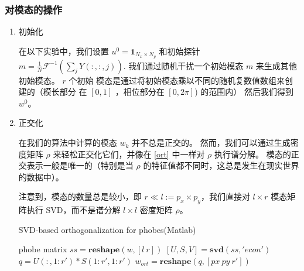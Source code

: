 \documentclass[12pt]{article}
\begin{document}
\subsubsection{对模态的操作}
\begin{enumerate} 
	\item 初始化
	
	在以下实验中，我们设置 $u^{0}=\mathbf{1}_{N_x \times N_y}$ 和初始探针
	$m=\frac{1}{N} \mathcal{F}^{-1}\left(\sum_{j} Y(:,:,j)\right)$. 我们通过随机干扰一个初始模态 $m$ 来生成其他初始模态。 $r$ 个初始
	模态是通过将初始模态乘以不同的随机复数值数组来创建的（模长部分
	在 $[0,1]$ ，相位部分在 $[0,2\pi]$) 的范围内） 然后我们得到$w^0$。
	
	\item 正交化
	
	在我们的算法中计算的模态 $w_k$ 并不总是正交的。 然而，我们可以通过生成密度矩阵 $\rho$ 来轻松正交化它们，并像在 \eqref{ort} 中一样对 $\rho$ 执行谱分解。 模态的正交表示一般是唯一的（特别是当 $\rho$ 的特征值都不同时，这总是发生在现实世界的数据中）。
	
	注意到，模态的数量总是较小，即 $r \ll l := p_x \times p_y$，我们直接对 $l \times r$ 模态矩阵执行 SVD，而不是谱分解 $l \times l$ 密度矩阵 $\rho $。
	
	\begin{algorithm}
		\caption{SVD-based orthogonalization for phobes(Matlab)}
		\label{alg:ort}
		phobe matrix $ss = \textbf{reshape}(w,[l\ r])$ \;
		$[U,S,V] = \textbf{svd}(ss,'econ')$ \;
		$q = U(:,1:r')*S(1:r',1:r')$ \;
		$w_{ort} = \textbf{reshape}(q,[px \ py \  r'])$ \;
		

\end{algorithm}
\end{enumerate}
\end{document}
